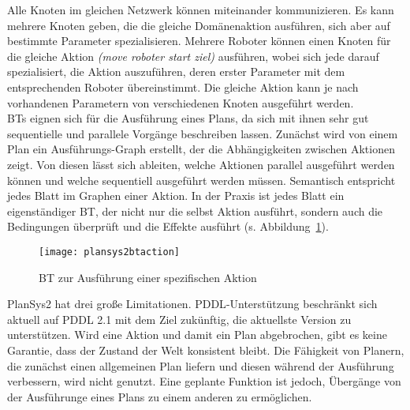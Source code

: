 Alle Knoten im gleichen Netzwerk können miteinander kommunizieren.
Es kann mehrere Knoten geben, die die gleiche Domänenaktion ausführen, sich aber auf bestimmte Parameter spezialisieren.
Mehrere Roboter können einen Knoten für die gleiche Aktion \emph{(move roboter start ziel)} ausführen, wobei sich jede darauf spezialisiert, die Aktion auszuführen, deren erster Parameter mit dem entsprechenden Roboter übereinstimmt.
Die gleiche Aktion kann je nach vorhandenen Parametern von verschiedenen Knoten ausgeführt werden.\\
\acp{BT} eignen sich für die Ausführung eines Plans, da sich mit ihnen sehr gut sequentielle und parallele Vorgänge beschreiben lassen.
Zunächst wird von einem Plan ein Ausführungs-Graph erstellt, der die Abhängigkeiten zwischen Aktionen zeigt.
Von diesen lässt sich ableiten, welche Aktionen parallel ausgeführt werden können und welche sequentiell ausgeführt werden müssen.
Semantisch entspricht jedes Blatt im Graphen einer Aktion.
In der Praxis ist jedes Blatt ein eigenständiger \ac{BT}, der nicht nur die selbst Aktion ausführt, sondern auch die Bedingungen überprüft und die Effekte ausführt (s. Abbildung~\ref{fig:plansysbtaction}).\\
\begin{figure}
    \centering
    \texttt{[image: plansys2btaction]}
    \caption{\ac{BT} zur Ausführung einer spezifischen Aktion~\cite{plansys}}
    \label{fig:plansysbtaction}
    \end{figure}
\ac{PlanSys2} hat drei große Limitationen.
\ac{PDDL}-Unterstützung beschränkt sich aktuell auf \ac{PDDL} 2.1 mit dem Ziel zukünftig, die aktuellste Version zu unterstützen.
Wird eine Aktion und damit ein Plan abgebrochen, gibt es keine Garantie, dass der Zustand der Welt konsistent bleibt.
Die Fähigkeit von Planern, die zunächst einen allgemeinen Plan liefern und diesen während der Ausführung verbessern, wird nicht genutzt.
Eine geplante Funktion ist jedoch, Übergänge von der Ausführunge eines Plans zu einem anderen zu ermöglichen.